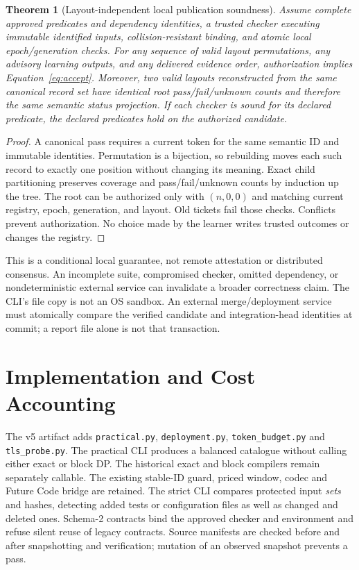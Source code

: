 \documentclass[11pt]{article}
\newtheorem{theorem}{Theorem}\newtheorem{proposition}[theorem]{Proposition}\newtheorem{lemma}[theorem]{Lemma}
\theoremstyle{definition}\newtheorem{definition}[theorem]{Definition}
\begin{document}
\begin{theorem}[Layout-independent local publication soundness]\label{thm:safety}
Assume complete approved predicates and dependency identities, a trusted checker executing immutable identified inputs, collision-resistant binding, and atomic local epoch/generation checks. For any sequence of valid layout permutations, any advisory learning outputs, and any delivered evidence order, authorization implies Equation~\eqref{eq:accept}. Moreover, two valid layouts reconstructed from the same canonical record set have identical root pass/fail/unknown counts and therefore the same semantic status projection. If each checker is sound for its declared predicate, the declared predicates hold on the authorized candidate.
\end{theorem}
\begin{proof}
A canonical pass requires a current token for the same semantic ID and immutable identities. Permutation is a bijection, so rebuilding moves each such record to exactly one position without changing its meaning. Exact child partitioning preserves coverage and pass/fail/unknown counts by induction up the tree. The root can be authorized only with $(n,0,0)$ and matching current registry, epoch, generation, and layout. Old tickets fail those checks. Conflicts prevent authorization. No choice made by the learner writes trusted outcomes or changes the registry.\end{proof}
This is a conditional local guarantee, not remote attestation or distributed consensus. An incomplete suite, compromised checker, omitted dependency, or nondeterministic external service can invalidate a broader correctness claim. The CLI's file copy is not an OS sandbox. An external merge/deployment service must atomically compare the verified candidate and integration-head identities at commit; a report file alone is not that transaction.

\section{Implementation and Cost Accounting}\label{sec:implementation}
The v5 artifact adds \texttt{practical.py}, \texttt{deployment.py}, \texttt{token\_budget.py} and \texttt{tls\_probe.py}. The practical CLI produces a balanced catalogue without calling either exact or block DP. The historical exact and block compilers remain separately callable. The existing stable-ID guard, priced window, codec and Future Code bridge are retained. The strict CLI compares protected input \emph{sets} and hashes, detecting added tests or configuration files as well as changed and deleted ones. Schema-2 contracts bind the approved checker and environment and refuse silent reuse of legacy contracts. Source manifests are checked before and after snapshotting and verification; mutation of an observed snapshot prevents a pass.
\end{document}
